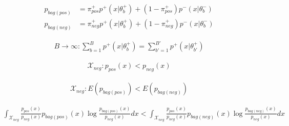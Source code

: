\begin{align}
  p_{bag(pos)} & = \pi_{pos}^+ p^+(x|\theta_b^+) + (1-\pi_{pos}^+) p^-(x|\theta_b^-) \\
  p_{bag(neg)} & = \pi_{neg}^+ p^+(x|\theta_b^+) + (1-\pi_{neg}^+) p^-(x|\theta_b^-)
\end{align}

\begin{align}
  B \rightarrow \infty : 
  \sum_{b = 1} ^B p^+(x|\theta_b^+) =  \sum_{b' = 1} ^{B'} p^+(x|\theta_{b'}^+)
\end{align}


\begin{align}
  \mathcal{X}_{neg}: p_{pos} (x) < p_{neg} (x) 
\end{align}
 
\begin{align}
  \mathcal{X}_{neg}: E(p_{bag(pos)}) < E(p_{bag(neg)})
\end{align}

\begin{align*}
  \int_{\mathcal{X}_{neg}} \frac{p_{pos}(x)}{p_{neg}(x)} p_{bag(pos)}(x) \log \frac{p_{bag(pos)}(x)}{p_{neg}(x)} dx <
   \int_{\mathcal{X}_{neg}} \frac{p_{pos}(x)}{p_{neg}(x)} p_{bag(neg)}(x) \log \frac{p_{bag(neg)}(x)}{p_{neg}(x)} dx
\end{align*}
 